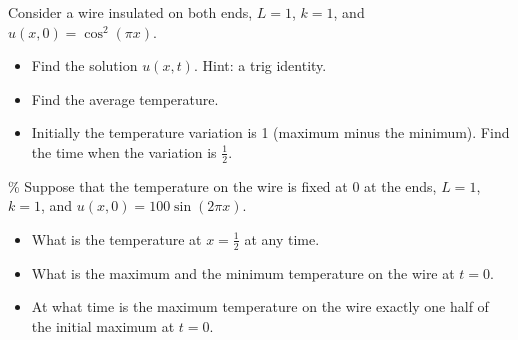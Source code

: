 \documentclass{ximera}
\begin{document}
\begin{exercise}
    Consider a wire insulated on both ends, $L=1$, $k=1$, and $u(x,0) = \cos^2(\pi x)$.
    \begin{itemize}
        \item Find the solution $u(x,t)$.  Hint: a trig identity.
        \item Find the average temperature.
        \item Initially the temperature variation is 1 (maximum minus the minimum). Find the time when the variation is $\frac{1}{2}$.
    \end{itemize}
\end{exercise}

\begin{exercise}\%
    Suppose that the temperature on the wire is fixed at $0$ at the ends, $L=1$, $k=1$, and $u(x,0) = 100\sin(2 \pi x)$.
    \begin{itemize}
        \item What is the temperature at $x = \frac{1}{2}$ at any time.
        \item What is the maximum and the minimum temperature on the wire at $t=0$.
        \item At what time is the maximum temperature on the wire exactly one half of the initial maximum at $t=0$.
    \end{itemize}
\end{exercise}
\end{document}
